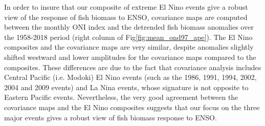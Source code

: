 In order to insure that our composite of extreme El Nino events give a robust view of the response of fish biomass to ENSO, covariance maps are computed between the monthly ONI index and the detrended fish biomass anomalies over the 1958-2018 period (right column of Fig\ref{fig:mean_ond97_ape}). The El Nino composites and the covariance maps are very similar, despite anomalies slightly shifted westward and lower amplitudes for the covariance maps compared to the composites. These  differences are due to the fact that covariance analysis includes Central Pacific (i.e. Modoki) El Nino events (such as the 1986, 1991, 1994, 2002, 2004 and 2009 events) and La Nina events, whose signature is not opposite to Eastern Pacific events. Nevertheless, the very good agreement between the covariance maps and the El Nino composites suggests that our focus on the three major events gives a robust view of fish biomass response to ENSO.